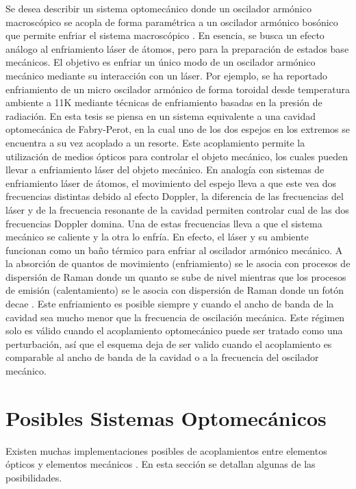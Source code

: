 \documentclass[a4paper,10pt]{report}
\begin{document}
Se desea describir un sistema optomecánico donde un oscilador armónico macroscópico se acopla de forma paramétrica a un oscilador armónico bosónico que permite enfriar el sistema macroscópico \cite{NooshiLC}. En esencia, se busca un efecto análogo al enfriamiento láser de átomos, pero para la preparación de estados base mecánicos. El objetivo es enfriar un único modo de un oscilador armónico mecánico mediante su interacción con un láser. Por ejemplo, se ha reportado enfriamiento de un micro oscilador armónico de forma toroidal desde temperatura ambiente a 11K mediante técnicas de enfriamiento basadas en la presión de radiación\cite{SchliesserRPC}. En esta tesis se piensa en un sistema equivalente a una cavidad optomecánica de Fabry-Perot, en la cual uno de los dos espejos en los extremos se encuentra a su vez acoplado a un resorte. Este acoplamiento permite la utilización de medios ópticos para controlar el objeto mecánico, los cuales pueden llevar a enfriamiento láser del objeto mecánico\cite{NooshiLC}. En analogía con sistemas de enfriamiento láser de átomos, el movimiento del espejo lleva a que este vea dos frecuencias distintas debido al efecto Doppler\cite{KippenberCO}, la diferencia de las frecuencias del láser y de la frecuencia resonante de la cavidad permiten controlar cual de las dos frecuencias Doppler domina. Una de estas frecuencias lleva a que el sistema mecánico se caliente y la otra lo enfría. En efecto, el láser y su ambiente funcionan como un baño térmico para enfriar al oscilador armónico mecánico. A la absorción de quantos de movimiento (enfriamiento) se le asocia con procesos de dispersión de Raman donde un quanto se sube de nivel mientras que los procesos de emisión (calentamiento) se le asocia con dispersión de Raman donde un fotón decae \cite{LCNooshi}. Este enfriamiento es posible siempre y cuando el ancho de banda de la cavidad sea mucho menor que la frecuencia de oscilación mecánica. \cite{LCNooshi} \cite{MarquardtSC} Este régimen solo es válido cuando el acoplamiento optomecánico puede ser tratado como una perturbación, así que el esquema deja de ser valido cuando el acoplamiento es comparable al ancho de banda de la cavidad o a la frecuencia del oscilador mecánico.

\section{Posibles Sistemas Optomecánicos}

Existen muchas implementaciones posibles de acoplamientos entre elementos ópticos y elementos mecánicos \cite{KippenberCO}. En esta sección se detallan algunas de las posibilidades.
\end{document}
